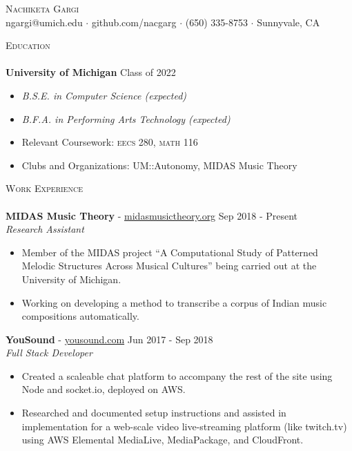 \documentclass[a4paper]{article}
\newcommand{\lineunder} {
	\vspace*{-8pt} \\
	\hspace*{-18pt} \hrulefill \\
}
\newcommand{\header} [1] {
	{\hspace*{-18pt}\vspace*{6pt} \textsc{#1}}
	\vspace*{-6pt} \lineunder
}
\begin{document}
\vspace*{-40pt}
	

\begin{center}
	{\Huge \scshape {Nachiketa Gargi}}\\
	ngargi@umich.edu $\cdot$ github.com/nacgarg $\cdot$ (650) 335-8753 $\cdot$ Sunnyvale, CA \\
\end{center}
\header{Education}
\noindent
\textbf{University of Michigan} \hfill Class of 2022
\vspace{-2mm}
\begin{itemize}
	\setlength{\itemindent}{-3mm}
	\item[] \textit{B.S.E. in Computer Science (expected)}\vspace{-3mm}
	\item[] \textit{B.F.A. in Performing Arts Technology (expected)}
	\item[] Relevant Coursework: \textsc{eecs} 280, \textsc{math} 116\vspace{-3mm}
	\item[] Clubs and Organizations: UM::Autonomy, MIDAS Music Theory
\end{itemize}

\noindent
\header{Work Experience}
\noindent
\textbf{MIDAS Music Theory} - \url{midasmusictheory.org} \hfill Sep 2018 - Present\\
\textit{Research Assistant} \\ 
\vspace{-6mm}
\begin{itemize} \itemsep 0.1pt
	\item Member of the MIDAS project “A Computational Study of Patterned Melodic Structures Across Musical Cultures” being carried out at the University of Michigan.
	\item Working on developing a method to transcribe a corpus of Indian music compositions automatically.
\end{itemize}

\noindent
\textbf{YouSound} - \url{yousound.com} \hfill Jun 2017 - Sep 2018\\
\textit{Full Stack Developer} \\
\vspace{-6mm}
\begin{itemize} \itemsep 0.1pt
	\item Created a scaleable chat platform to accompany the rest of the site using Node and socket.io, deployed on AWS.
	\item Researched and documented setup instructions and assisted in implementation for a web-scale video live-streaming platform (like twitch.tv) using AWS Elemental MediaLive, MediaPackage, and CloudFront.
\end{itemize}
\end{document}

